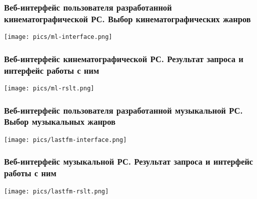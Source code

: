 \documentclass[10pt,xcolor={usenames,dvipsnames}]{beamer}
\theoremstyle{break}
\begin{document}
\begin{frame}
  \frametitle{Веб-интерфейс пользователя разработанной кинематографической РС. Выбор кинематографических жанров}
  \begin{center}
    \texttt{[image: pics/ml-interface.png]}
  \end{center}
\end{frame}

\begin{frame}
  \frametitle{Веб-интерфейс кинематографической РС. Результат запроса и интерфейс работы с ним}
  \begin{center}
    \texttt{[image: pics/ml-rslt.png]}
  \end{center}
\end{frame}

\begin{frame}
  \frametitle{Веб-интерфейс пользователя разработанной музыкальной РС. Выбор музыкальных жанров}
  \begin{center}
    \texttt{[image: pics/lastfm-interface.png]}
  \end{center}
\end{frame}

\begin{frame}
  \frametitle{Веб-интерфейс музыкальной РС. Результат запроса и интерфейс работы с ним}
  \begin{center}
    \texttt{[image: pics/lastfm-rslt.png]}
  \end{center}
\end{frame}
\end{document}
